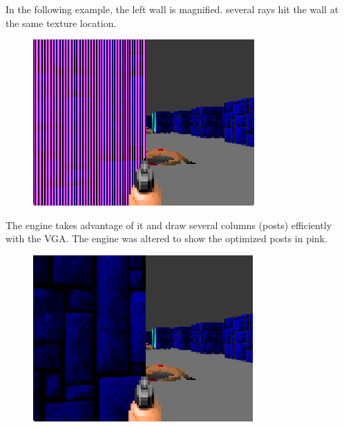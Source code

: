 In the following example, the left wall is magnified. several rays hit the wall at the same texture location.
\begin{figure}[H]
 \centering
 \includegraphics[width=\textwidth]{screenshots/post_optimization_1_pink_show.png}
\end{figure}
The engine takes advantage of it and draw several columns (posts) efficiently with the VGA. The engine was altered to show the optimized posts in pink.
\begin{figure}[H]
 \centering
 \includegraphics[width=\textwidth]{screenshots/post_optimization_1_show.png}
\end{figure}

